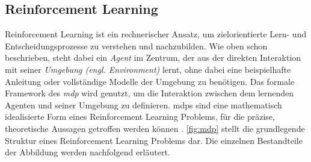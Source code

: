     
    
    
    
    


\subsection{Reinforcement Learning}
Reinforcement Learning ist ein rechnerischer Ansatz, um zielorientierte Lern- und Entscheidungsprozesse zu verstehen und nachzubilden.
Wie oben schon beschrieben, steht dabei ein \emph{Agent} im Zentrum, der aus der direkten Interaktion mit seiner \emph{Umgebung (engl. Environment)} lernt, ohne dabei eine beispielhafte Anleitung oder vollständige Modelle der Umgebung zu benötigen.
Das formale Framework des \emph{\ac{mdp}} wird genutzt, um die Interaktion zwischen dem lernenden Agenten und seiner Umgebung zu definieren.
\acp{mdp} sind eine mathematisch idealisierte Form eines Reinforcement Learning Problems, für die präzise, theoretische Aussagen getroffen werden können \cite[13]{sutton2018rlintro}.
\autoref{fig:mdp} stellt die grundlegende Struktur eines Reinforcement Learning Problems dar.
Die einzelnen Bestandteile der Abbildung werden nachfolgend erläutert.

